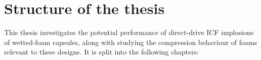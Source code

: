 

\section{Structure of the thesis}

This thesis investigates the potential performance of direct-drive ICF implosions of wetted-foam capsules, along with studying the compression behaviour of foams relevant to these designs. It is split into the following chapters:

